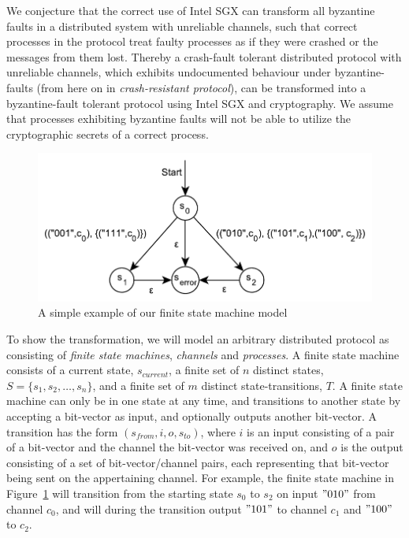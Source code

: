 \documentclass{article}
\begin{document}
	We conjecture that the correct use of Intel SGX can transform all byzantine faults in a distributed system with unreliable channels, such that correct processes in the protocol treat faulty processes as if they were crashed or the messages from them lost.
	Thereby a crash-fault tolerant distributed protocol with unreliable channels, which exhibits undocumented behaviour under byzantine-faults (from here on in \textit{crash-resistant protocol}), can be transformed into a byzantine-fault tolerant protocol using Intel SGX and cryptography.
	We assume that processes exhibiting byzantine faults will not be able to utilize the cryptographic secrets of a correct process.

	\begin{figure}
		\center
		\includegraphics[scale=0.6]{figures/state-machines/simple-NFA.pdf}
		\caption{A simple example of our finite state machine model\label{fig:simple-nfa}}
	\end{figure}
	\FloatBarrier

	To show the transformation, we will model an arbitrary distributed protocol as consisting of \textit{finite state machines}, \textit{channels} and \textit{processes}.
	A finite state machine consists of a current state, $s_{current}$, a finite set of $n$ distinct states, $S=\{s_1, s_2, \dots, s_n\}$, and a finite set of $m$ distinct state-transitions, $T$.
	A finite state machine can only be in one state at any time, and transitions to another state by accepting a bit-vector as input, and optionally outputs another bit-vector.
	A transition has the form $(s_{from}, i, o, s_{to})$, where $i$ is an input consisting of a pair of a bit-vector and the channel the bit-vector was received on, and $o$ is the output consisting of a set of bit-vector/channel pairs, each representing that bit-vector being sent on the appertaining channel.
	For example, the finite state machine in Figure~\ref{fig:simple-nfa} will transition from the starting state $s_0$ to $s_2$ on input $"010"$ from channel $c_0$, and will during the transition output $"101"$ to channel $c_1$ and $"100"$ to $c_2$.
\end{document}
